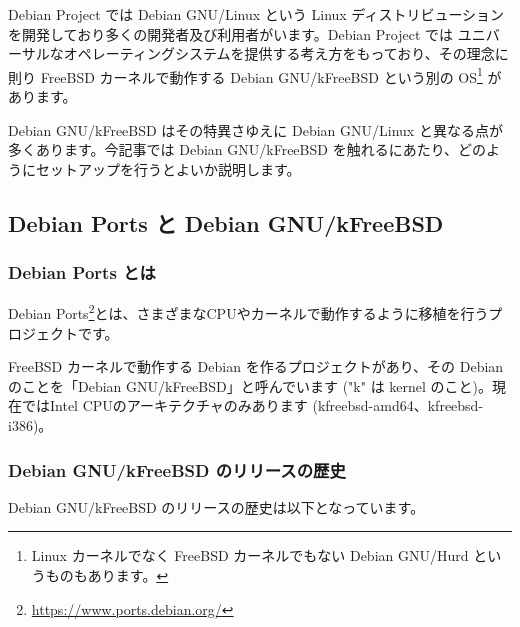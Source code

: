 \documentclass[mingoth,a4paper]{jsarticle}
\begin{document}
Debian Project では Debian GNU/Linux という Linux ディストリビューションを開発しており多くの開発者及び利用者がいます。Debian Project では ユニバーサルなオペレーティングシステムを提供する考え方をもっており、その理念に則り FreeBSD カーネルで動作する Debian GNU/kFreeBSD という別の OS\footnote{Linux カーネルでなく FreeBSD カーネルでもない Debian GNU/Hurd というものもあります。} があります。

Debian GNU/kFreeBSD はその特異さゆえに Debian GNU/Linux と異なる点が多くあります。今記事では Debian GNU/kFreeBSD を触れるにあたり、どのようにセットアップを行うとよいか説明します。


\subsection{Debian Ports と Debian GNU/kFreeBSD}

\subsubsection{Debian Ports とは}

Debian Ports\footnote{\url{https://www.ports.debian.org/}}とは、さまざまなCPUやカーネルで動作するように移植を行うプロジェクトです。

FreeBSD カーネルで動作する Debian を作るプロジェクトがあり、その Debian のことを「Debian GNU/kFreeBSD」と呼んでいます ("k" は kernel のこと)。現在ではIntel CPUのアーキテクチャのみあります (kfreebsd-amd64、kfreebsd-i386)。

\subsubsection{Debian GNU/kFreeBSD のリリースの歴史}

Debian GNU/kFreeBSD のリリースの歴史は以下となっています。
\end{document}
